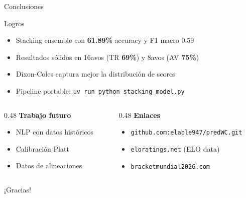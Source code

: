 \documentclass[aspectratio=169,10pt]{beamer}
\newcommand{\pct}[1]{\textbf{#1\%}}
\newcommand{\code}[1]{\texttt{#1}}
\begin{document}
\begin{frame}{Conclusiones}
  \begin{exampleblock}{Logros}
    \begin{itemize}
      \item Stacking ensemble con \pct{61.89} accuracy y F1 macro 0.59
      \item Resultados sólidos en 16avos (TR \pct{69}) y 8avos (AV \pct{75})
      \item Dixon-Coles captura mejor la distribución de scores
      \item Pipeline portable: \code{uv run python stacking\_model.py}
    \end{itemize}
  \end{exampleblock}

  \vspace{0.3cm}
  \begin{columns}[T]
    \begin{column}{0.48\textwidth}
      \textbf{Trabajo futuro}
      \begin{itemize}\small
        \item NLP con datos históricos
        \item Calibración Platt
        \item Datos de alineaciones
      \end{itemize}
    \end{column}
    \begin{column}{0.48\textwidth}
      \textbf{Enlaces}
      \begin{itemize}\small
        \item \code{github.com:elable947/predWC.git}
        \item \code{eloratings.net} (ELO data)
        \item \code{bracketmundial2026.com}
      \end{itemize}
    \end{column}
  \end{columns}

  \vspace{0.3cm}
  \centering
  \footnotesize ¡Gracias!
\end{frame}
\end{document}
